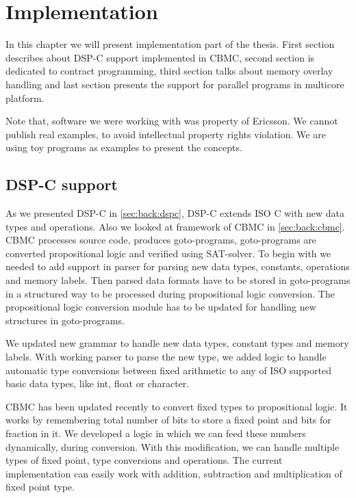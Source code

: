 \chapter{Implementation} \label{chap:implementation}

In this chapter we will present implementation part of the thesis. First section describes about DSP-C support implemented in CBMC, second section is dedicated to contract programming, third section talks about memory overlay handling and last section presents the support for parallel programs in multicore platform.

Note that, software we were working with was property of Ericsson. We cannot publish real examples, to avoid intellectual property rights violation. We are using toy programs as examples to present the concepts.

\section{DSP-C support} 

As we presented DSP-C in \autoref{sec:back:dspc}, DSP-C extends ISO C with new data types and operations. Also we looked at framework of CBMC in \autoref{sec:back:cbmc}. CBMC processes source code, produces goto-programs, goto-programs are converted propositional logic and verified using SAT-solver. To begin with we needed to add support in parser for parsing new data types, constants, operations and memory labels. Then parsed data formats have to be stored in goto-programs in a structured way to be processed during propositional logic conversion. The propositional logic conversion module has to be updated for handling new structures in goto-programs.

We updated new grammar to handle new data types, constant types and memory labels.  With working parser to parse the new type, we added logic to handle automatic type conversions between fixed arithmetic to any of ISO supported basic data types, like int, float or character.

CBMC has been updated recently to convert fixed types to propositional logic. It works by remembering total number of bits to store a fixed point and bits for fraction in it. We developed a logic in which we can feed these numbers dynamically, during conversion. With this modification, we can handle multiple types of fixed point, type conversions and operations. The current implementation can easily work with addition, subtraction and multiplication of fixed point type.

